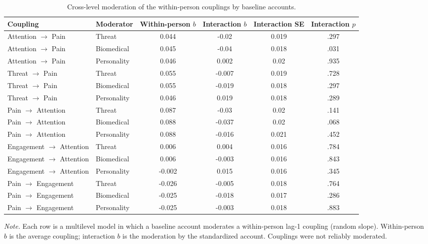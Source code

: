 \begin{table}[!htbp]
\raggedright
\caption{Cross-level moderation of the within-person couplings by baseline accounts.}
\label{tab:sup-moderation}
\scriptsize
\begingroup
\setlength{\tabcolsep}{4pt}
\renewcommand{\arraystretch}{1.08}
\noindent
\begin{tabular*}{\textwidth}{@{\extracolsep{\fill}}llcccc@{}}
\toprule
Coupling & Moderator & Within-person $b$ & Interaction $b$ & Interaction SE & Interaction $p$ \\
\midrule
Attention $\rightarrow$ Pain & Threat & 0.044 & -0.02 & 0.019 & .297 \\
Attention $\rightarrow$ Pain & Biomedical & 0.045 & -0.04 & 0.018 & .031 \\
Attention $\rightarrow$ Pain & Personality & 0.046 & 0.002 & 0.02 & .935 \\
Threat $\rightarrow$ Pain & Threat & 0.055 & -0.007 & 0.019 & .728 \\
Threat $\rightarrow$ Pain & Biomedical & 0.055 & -0.019 & 0.018 & .297 \\
Threat $\rightarrow$ Pain & Personality & 0.046 & 0.019 & 0.018 & .289 \\
Pain $\rightarrow$ Attention & Threat & 0.087 & -0.03 & 0.02 & .141 \\
Pain $\rightarrow$ Attention & Biomedical & 0.088 & -0.037 & 0.02 & .068 \\
Pain $\rightarrow$ Attention & Personality & 0.088 & -0.016 & 0.021 & .452 \\
Engagement $\rightarrow$ Attention & Threat & 0.006 & 0.004 & 0.016 & .784 \\
Engagement $\rightarrow$ Attention & Biomedical & 0.006 & -0.003 & 0.016 & .843 \\
Engagement $\rightarrow$ Attention & Personality & -0.002 & 0.015 & 0.016 & .345 \\
Pain $\rightarrow$ Engagement & Threat & -0.026 & -0.005 & 0.018 & .764 \\
Pain $\rightarrow$ Engagement & Biomedical & -0.025 & -0.018 & 0.017 & .286 \\
Pain $\rightarrow$ Engagement & Personality & -0.025 & -0.003 & 0.018 & .883 \\
\bottomrule
\end{tabular*}
\par\vspace{3pt}\noindent\parbox{\textwidth}{\scriptsize\textit{Note.} Each row is a multilevel model in which a baseline account moderates a within-person lag-1 coupling (random slope). Within-person $b$ is the average coupling; interaction $b$ is the moderation by the standardized account. Couplings were not reliably moderated.}
\endgroup
\end{table}
